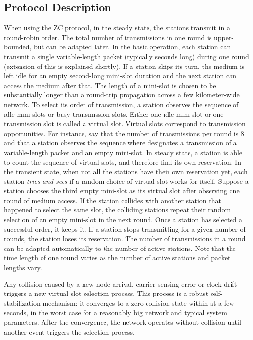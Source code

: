 \documentclass{acm_proc_article-sp}
\begin{document}
\subsection{Protocol Description}
When using the ZC protocol, in the steady state, the stations transmit in a round-robin order.  The total number of transmissions in one round is upper-bounded, but can be adapted later. In the basic operation, each station can transmit a single variable-length packet (typically  seconds long) during one round (extension of this is explained shortly). If a station skips its turn, the medium is left idle for an empty  second-long mini-slot duration and the next station can access the medium after that. The length of a mini-slot is chosen to be substantially longer than a round-trip propagation across a few kilometer-wide network. To select its order of transmission, a station observes the sequence of idle mini-slots or busy transmission slots. Either one idle mini-slot or one transmission slot is called a virtual slot. Virtual slots correspond to transmission opportunities.  For instance, say that the number of transmissions per round is 8 and that a station observes the sequence  where  designates a transmission of a variable-length packet and  an empty mini-slot. In steady state, a station is able to count the sequence of virtual slots, and therefore find its own reservation.
In the transient state, when not all the stations have their own reservation yet, each station \textit{tries and sees} if a random choice of virtual slot works for itself. Suppose a station chooses the third empty mini-slot as its virtual slot after observing one round of medium access. If the station collides with another station that happened to select the same slot, the colliding stations repeat their random selection of an empty mini-slot in the next round.  Once a station has selected a successful order, it keeps it.  If a station stops transmitting for a given number of rounds, the station loses its reservation. The number of transmissions in a round can be adapted automatically to the number of active stations. Note that the time length of one round varies as the number of active stations and packet lengths vary.

Any collision caused by a new node arrival, carrier sensing error or clock drift triggers a new virtual slot selection process. This process is a robust self-stabilization mechanism: it converges to a zero collision state within at a few seconds, in the worst case for a reasonably big network and typical system parameters. After the convergence, the network operates without collision until another event triggers the selection process.
\end{document}
